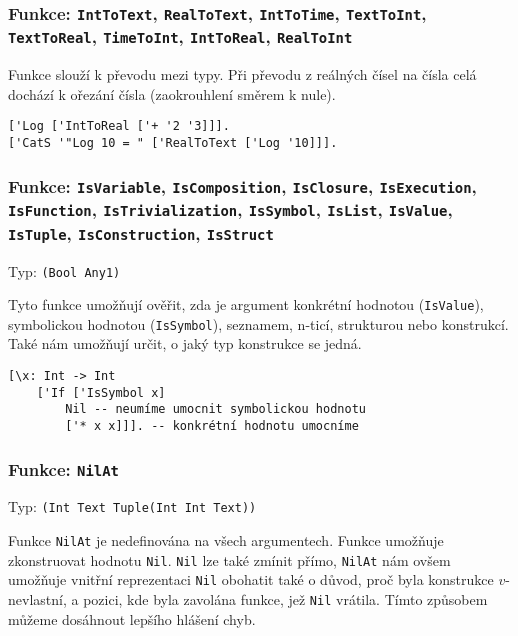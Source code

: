 \subsubsection*{Funkce: \lstinline{IntToText},
\lstinline{RealToText},
\lstinline{IntToTime},
\lstinline{TextToInt},
\lstinline{TextToReal},
\lstinline{TimeToInt},
\lstinline{IntToReal},
\lstinline{RealToInt}
}

Funkce slouží k převodu mezi typy. Při převodu z reálných čísel na čísla celá dochází k ořezání
čísla (zaokrouhlení směrem k nule).

\begin{lstlisting}[caption={Ukázka využití konverzí}]
['Log ['IntToReal ['+ '2 '3]]].
['CatS '"Log 10 = " ['RealToText ['Log '10]]].
\end{lstlisting}

\subsubsection*{Funkce:
\lstinline{IsVariable},
\lstinline{IsComposition},
\lstinline{IsClosure},
\lstinline{IsExecution},
\lstinline{IsFunction},
\lstinline{IsTrivialization},
\lstinline{IsSymbol},
\lstinline{IsList},
\lstinline{IsValue},
\lstinline{IsTuple},
\lstinline{IsConstruction},
\lstinline{IsStruct}
}

Typ: \lstinline{(Bool Any1)}

Tyto funkce umožňují ověřit, zda je argument konkrétní hodnotou (\lstinline{IsValue}), symbolickou
hodnotou (\lstinline{IsSymbol}), seznamem, n-ticí, strukturou nebo konstrukcí. Také nám umožňují
určit, o jaký typ konstrukce se jedná.

\begin{lstlisting}[caption={Ukázka využití IsSymbol}]
[\x: Int -> Int
    ['If ['IsSymbol x]
        Nil -- neumíme umocnit symbolickou hodnotu
        ['* x x]]]. -- konkrétní hodnotu umocníme
\end{lstlisting}

\subsubsection*{Funkce: \lstinline{NilAt}}\label{nilat-fn}
Typ: \lstinline{(Int Text Tuple(Int Int Text))}

Funkce \lstinline{NilAt} je nedefinována na všech argumentech. Funkce umožňuje zkonstruovat hodnotu
\lstinline{Nil}. \lstinline{Nil} lze také zmínit přímo, \lstinline{NilAt} nám ovšem umožňuje vnitřní
reprezentaci \lstinline{Nil} obohatit také o důvod, proč byla konstrukce $v$-nevlastní, a pozici,
kde byla zavolána funkce, jež \lstinline{Nil} vrátila. Tímto způsobem můžeme dosáhnout lepšího
hlášení chyb.

